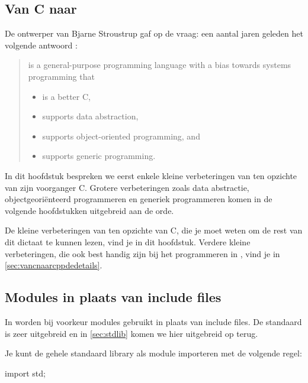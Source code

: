 \begin{cpplstShortInline}
\chapter[Van C naar C++]{Van C naar \Cpp{}}
\label{sec:vancnaarcpp}
De ontwerper van \Cpp{} Bjarne Stroustrup gaf op de vraag:  een aantal jaren geleden het volgende antwoord \cite{Stroustrup2000}:
\begin{quote}
    \begin{otherlanguage}{usenglish}
        \Cpp{} is a general-purpose programming language with a bias towards systems programming that
        \begin{itemize}
            \item is a better C,
            \item supports data abstraction,
            \item supports object-oriented programming, and
            \item supports generic programming.
        \end{itemize}
    \end{otherlanguage}
\end{quote}
In dit hoofdstuk bespreken we eerst enkele kleine verbeteringen van \Cpp{} ten opzichte van zijn voorganger C.
Grotere verbeteringen zoals data abstractie, objectgeoriënteerd programmeren en generiek programmeren komen in de volgende hoofdstukken uitgebreid aan de orde.

De kleine verbeteringen van \Cpp{} ten opzichte van C, die je moet weten om de rest van dit dictaat te kunnen lezen, vind je in dit hoofdstuk.
Verdere kleine verbeteringen, die ook best handig zijn bij het programmeren in \Cpp{}, vind je in \cref{sec:vancnaarcppdedetails}.

\section{Modules in plaats van include files}
\label{sec:modules}
In \Cpp{} worden bij voorkeur modules gebruikt in plaats van include files.
De standaard \Cpp{}  is zeer uitgebreid en in \cref{sec:stdlib} komen we hier uitgebreid op terug.

Je kunt de gehele standaard \Cpp{} library als module importeren met de volgende regel:
\begin{cpplstfragment}
	import std;
\end{cpplstfragment}


\end{cpplstShortInline}

